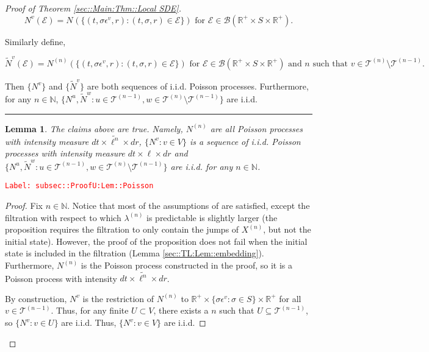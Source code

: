 \documentclass[12pt]{article}
\newcommand{\mb}{\mathbb}
\newcommand{\mc}{\mathcal}
\newcommand{\ms}{\mathscr}
\newcommand{\te}{\text}
\newcommand{\ep}{\epsilon}
\newcommand{\tr}{\textcolor{red}}
\newcommand{\labe}[1]{\tr{\texttt{Label: #1}}}
\newcommand{\ind}{\hspace{24pt}}
\newcommand{\lin}{\rule{\linewidth}{0.4 pt}}
\renewcommand{\v}{v}							%
\newcommand{\vv}{u}								%
\newcommand{\vvv}{w}							%
\renewcommand{\U}{U}							%
\renewcommand{\S}{S}							%
\newcommand{\s}{\sigma}							%
\newcommand{\ev}{\ep}							%
\renewcommand{\t}{t}							%
\newcommand{\X}{X}								%
\newcommand{\vind}[1]{^{#1}}					%
\newcommand{\cind}[1]{_{#1}}					%
\newcommand{\tip}[1]{#1}						%
\newcommand{\tree}{\mc{T}}						%
\newcommand{\sln}[1]{^{(#1)}}					%
\newcommand{\poiss}{N}							%
\newcommand{\Sm}{\ell}							%
\newcommand{\rate}{\lambda}						%
\renewcommand{\r}{r}							%
\newcommand{\alt}[1]{\widetilde{#1}}			%
\newcommand{\evnt}{\mc{E}}						%
\newtheorem{lem}[thms]{Lemma}
\begin{document}
\begin{proof}[Proof of Theorem \ref{sec::Main:Thm::Local SDE}]
\[\poiss\vind{\v}(\evnt) = \poiss\vind{}\left(\{(\t,\s\ev\vind{\v},\r):(\t,\s,\r)\in \evnt\}\right) \te{ for } \evnt \in \ms{B}(\mb{R}^+\times\S\times\mb{R}^+).\]

Similarly define,

\[\alt{\poiss}\vind{\v}(\evnt) = \poiss\sln{n}\left(\{(\t,\s\ev\vind{\v},\r):(\t,\s,\r)\in \evnt\}\right)\te{ for } \evnt \in \ms{B}(\mb{R}^+\times\S\times\mb{R}^+)\te{ and }n\te{ such that } \v\in \tree\sln{n}\setminus\tree\sln{n-1}.\]

Then \(\{\poiss\vind{\v}\}\) and \(\{\alt{\poiss}\vind{\v}\}\) are both sequences of i.i.d. Poisson processes. Furthermore, for any \(n \in \mb{N}\), \(\{\poiss\vind{\vv},\alt{\poiss}\vind{\vvv}:\vv\in \tree\sln{n-1},\vvv\in\tree\sln{n}\setminus\tree\sln{n-1}\}\) are i.i.d.

\lin

\begin{lem}
The claims above are true. Namely, \(\poiss\sln{n}\) are all Poisson processes with intensity measure \(d\t\times\alt{\Sm^{n}}\times d\r\), \(\{\poiss\vind{\v}:\v\in V\}\) is a sequence of i.i.d. Poisson processes with intensity measure \(d\t\times\Sm\times d\r\) and \(\{\poiss\vind{\vv},\alt{\poiss}\vind{\vvv}:\vv\in \tree\sln{n-1},\vvv\in\tree\sln{n}\setminus\tree\sln{n-1}\}\) are i.i.d. for any \(n \in \mb{N}\).

\label{subsec::ProofU:Lem::Poisson}
\end{lem}
\labe{subsec::ProofU:Lem::Poisson}
\begin{proof}

Fix \(n \in \mb{N}\). Notice that most of the assumptions of \cite[Proposition 14.7.I(b)]{DalVer08} are satisfied, except the filtration with respect to which \(\rate\sln{n}\) is predictable is slightly larger (the proposition requires the filtration to only contain the jumps of \(\X\sln{n}\cind{}\tip{}\), but not the initial state). However, the proof of the proposition does not fail when the initial state is included in the filtration (Lemma \ref{sec::TL:Lem::embedding}). Furthermore, \(\poiss\sln{n}\) is the Poisson process constructed in the proof, so it is a Poisson process with intensity \(d\t\times \alt{\Sm^n}\times d\r\).

\ind By construction, \(\poiss\vind{\v}\) is the restriction of \(\poiss\sln{n}\) to \(\mb{R}^+ \times \{\s\ev\vind{\v}: \s\in \S\}\times \mb{R}^+\) for all \(\v\in \tree\sln{n-1}\). Thus, for any finite \(\U \subset V\), there exists a \(n\) such that \(\U \subseteq \tree\sln{n-1}\), so \(\{\poiss\vind{\v}: \v\in \U\}\) are i.i.d. Thus, \(\{\poiss\vind{\v}: \v\in V\}\) are i.i.d.


\end{proof}
\end{proof}
\end{document}
